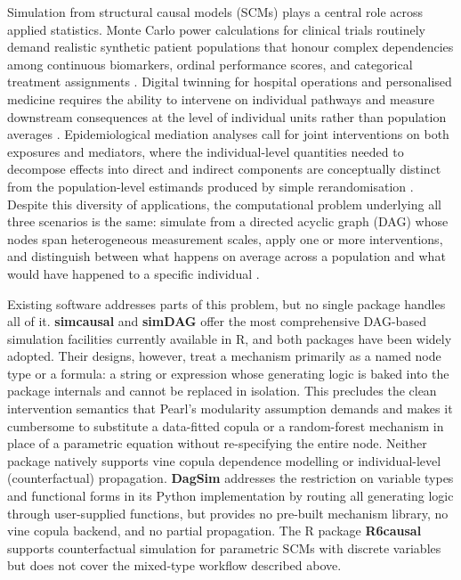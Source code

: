 \documentclass[12pt]{article}
\newcommand{\pkg}[1]{\textbf{#1}}
\newcommand{\proglang}[1]{\textsf{#1}}
\begin{document}
Simulation from structural causal models (SCMs) plays a central role across
applied statistics. Monte Carlo power calculations for clinical trials routinely
demand realistic synthetic patient populations that honour complex dependencies
among continuous biomarkers, ordinal performance scores, and categorical treatment
assignments \citep{morris2019using, burton2006design}. Digital twinning for hospital
operations and personalised medicine requires the ability to intervene on individual
pathways and measure downstream consequences at the level of individual units rather
than population averages \citep{laubenbacher2024digital}. Epidemiological mediation
analyses call for joint interventions on both exposures and mediators, where the
individual-level quantities needed to decompose effects into direct and indirect
components \citep{vanderweele2015explanation, pearl2001direct} are conceptually
distinct from the population-level estimands produced by simple rerandomisation
\citep{robins1992identifiability}. Despite this diversity of applications, the
computational problem underlying all three scenarios is the same: simulate from a
directed acyclic graph (DAG) \citep{pearl2009causality, spirtes2000causation} whose
nodes span heterogeneous measurement scales, apply one or more interventions, and
distinguish between what happens on average across a population and what would have
happened to a specific individual \citep{rubin1974estimating, neyman1923}.

Existing software addresses parts of this problem, but no single package handles
all of it. \pkg{simcausal} \citep{sofrygin2017simcausal} and
\pkg{simDAG} \citep{denz2026simdag} offer the most comprehensive DAG-based
simulation facilities currently available in \proglang{R}, and both packages have
been widely adopted. Their designs, however, treat a mechanism primarily as a
named node type or a formula: a string or expression whose generating logic is
baked into the package internals and cannot be replaced in isolation. This
precludes the clean intervention semantics that Pearl's modularity assumption
\citep{pearl2009causality} demands and makes it cumbersome to substitute a
data-fitted copula or a random-forest mechanism in place of a parametric equation
without re-specifying the entire node. Neither package natively supports vine
copula dependence modelling or individual-level (counterfactual) propagation.
\pkg{DagSim} \citep{alhajj2023dagsim} addresses the restriction on variable types
and functional forms in its \proglang{Python} implementation by routing all
generating logic through user-supplied functions, but provides no pre-built
mechanism library, no vine copula backend, and no partial propagation. The
\proglang{R} package \pkg{R6causal} \citep{tikka2024r6causal} supports
counterfactual simulation for parametric SCMs with discrete variables but does not
cover the mixed-type workflow described above.
\end{document}
